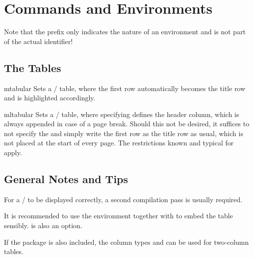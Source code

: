 \documentclass{sopra-base}
\begin{document}
%
%
%
%

\section{Commands and Environments}

Note that the prefix  only indicates the nature of an environment and is not part of the actual identifier!

\subsection{The Tables}

\begin{environment}{mtabular}{}
    Sets a / table, where the first row automatically becomes the title row and is highlighted accordingly.
\end{environment}

\begin{environment}{mltabular}{}
    Sets a / table, where specifying  defines the header column, which is always appended in case of a page break. Should this not be desired, it suffices to not specify the  and simply write the first row as the title row as usual,
    which is not placed at the start of every page. The restrictions known and typical for  apply.
\end{environment}

\subsection{General Notes and Tips}

For a / to be displayed correctly, a second compilation pass is usually required.\par{}
It is recommended to use the  environment together with  to embed the table sensibly.  is also an option.\par{}
If the  package is also included, the column types  and  can be used for two-column tables.
\end{document}
